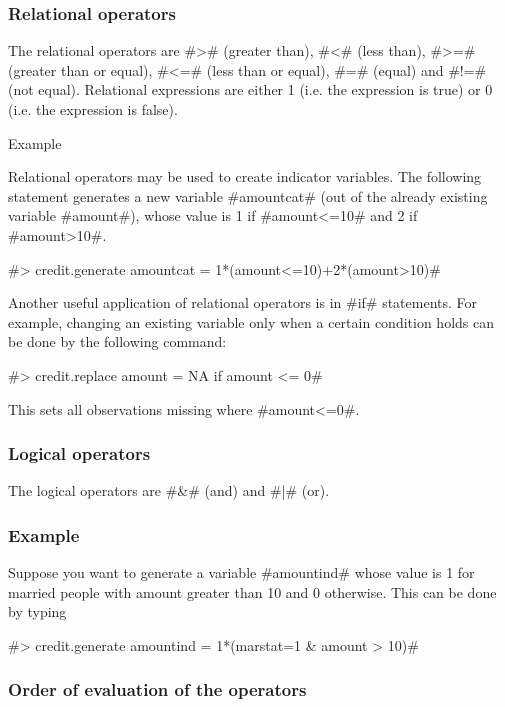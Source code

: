 \subsubsection{Relational operators}

The relational operators are #># (greater than), #<# (less than),
#>=# (greater than or equal), #<=# (less than or equal), #=#
(equal) and #!=# (not equal). Relational expressions are either 1
(i.e. the expression is true) or 0 (i.e. the expression is
false).\\

\begin{stanza}{Example}

Relational operators may be used to create indicator variables.
The following statement generates a new variable #amountcat# (out
of the already existing variable #amount#), whose
value is 1 if #amount<=10# and 2 if #amount>10#.

#> credit.generate amountcat = 1*(amount<=10)+2*(amount>10)#

Another useful application of relational operators is in #if#
statements. For example, changing
an existing variable only when a certain condition holds can be done by the following command:

#> credit.replace amount = NA if amount <= 0#

This sets all observations missing where #amount<=0#.
\end{stanza}

\subsubsection{Logical operators}

The logical operators are #&# (and) and #|# (or).

\subsubsection*{Example}

Suppose you want to generate a variable #amountind# whose value is
1 for married people with
amount greater than 10 and 0 otherwise. This can be done by typing

#> credit.generate amountind = 1*(marstat=1 & amount > 10)#

\subsubsection{Order of evaluation of the operators}

